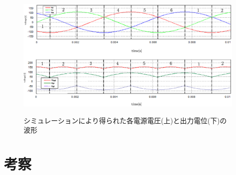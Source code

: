 \documentclass[a4paper,12pt]{jarticle}
\begin{document}
\begin{figure}[tb]
 \centering
 \vspace{0.5cm}
 \includegraphics[scale=0.85]{../figure/waves.eps}\\
 \hspace{0.0cm}
 \caption{シミュレーションにより得られた各電源電圧(上)と出力電位(下)の波形}
 \label{wave}
\end{figure}

\newpage

\section{考察}
\end{document}
